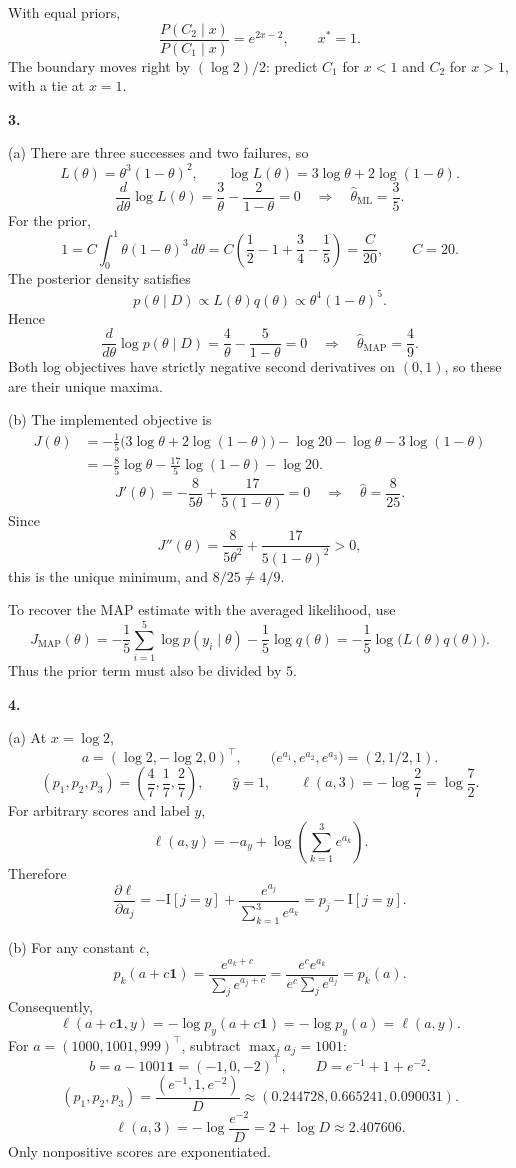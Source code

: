 \documentclass[11pt,a4paper]{article}
\begin{document}
With equal priors,
\[
\frac{P(C_2\mid x)}{P(C_1\mid x)}=e^{2x-2},\qquad x^*=1.
\]
The boundary moves right by $(\log2)/2$: predict $C_1$ for $x<1$ and
$C_2$ for $x>1$, with a tie at $x=1$.

\newpage
\textbf{3.}

(a) There are three successes and two failures, so
\[
L(\theta)=\theta^3(1-\theta)^2,\qquad
\log L(\theta)=3\log\theta+2\log(1-\theta).
\]
\[
\frac{d}{d\theta}\log L(\theta)
=\frac3\theta-\frac2{1-\theta}=0
\quad\Longrightarrow\quad \widehat\theta_{\mathrm{ML}}=\frac35.
\]
For the prior,
\[
1=C\int_0^1\theta(1-\theta)^3\,d\theta
=C\left(\frac12-1+\frac34-\frac15\right)=\frac C{20},
\qquad C=20.
\]
The posterior density satisfies
\[
p(\theta\mid D)\propto L(\theta)q(\theta)
\propto\theta^4(1-\theta)^5.
\]
Hence
\[
\frac{d}{d\theta}\log p(\theta\mid D)
=\frac4\theta-\frac5{1-\theta}=0
\quad\Longrightarrow\quad \widehat\theta_{\mathrm{MAP}}=\frac49.
\]
Both log objectives have strictly negative second derivatives on $(0,1)$,
so these are their unique maxima.

(b) The implemented objective is
\begin{align*}
J(\theta)
&=-\frac15\bigl(3\log\theta+2\log(1-\theta)\bigr)
-\log20-\log\theta-3\log(1-\theta)\\
&=-\frac85\log\theta-\frac{17}{5}\log(1-\theta)-\log20.
\end{align*}
\[
J'(\theta)=-\frac8{5\theta}+\frac{17}{5(1-\theta)}=0
\quad\Longrightarrow\quad \widehat\theta=\frac8{25}.
\]
Since
\[
J''(\theta)=\frac8{5\theta^2}+\frac{17}{5(1-\theta)^2}>0,
\]
this is the unique minimum, and $8/25\ne4/9$.

To recover the MAP estimate with the averaged likelihood, use
\[
J_{\mathrm{MAP}}(\theta)
=-\frac15\sum_{i=1}^5\log p(y_i\mid\theta)-\frac15\log q(\theta)
=-\frac15\log\bigl(L(\theta)q(\theta)\bigr).
\]
Thus the prior term must also be divided by $5$.

\newpage
\textbf{4.}

(a) At $x=\log2$,
\[
a=(\log2,-\log2,0)^\top,\qquad
\bigl(e^{a_1},e^{a_2},e^{a_3}\bigr)=(2,1/2,1).
\]
\[
(p_1,p_2,p_3)=\left(\frac47,\frac17,\frac27\right),\qquad
\widehat y=1,\qquad \ell(a,3)=-\log\frac27=\log\frac72.
\]
For arbitrary scores and label $y$,
\[
\ell(a,y)=-a_y+\log\left(\sum_{k=1}^3e^{a_k}\right).
\]
Therefore
\[
\frac{\partial\ell}{\partial a_j}
=-\mathrm{I}[j=y]+\frac{e^{a_j}}{\sum_{k=1}^3e^{a_k}}
=p_j-\mathrm{I}[j=y].
\]

(b) For any constant $c$,
\[
p_k(a+c\mathbf1)
=\frac{e^{a_k+c}}{\sum_j e^{a_j+c}}
=\frac{e^ce^{a_k}}{e^c\sum_j e^{a_j}}
=p_k(a).
\]
Consequently,
\[
\ell(a+c\mathbf1,y)=-\log p_y(a+c\mathbf1)
=-\log p_y(a)=\ell(a,y).
\]
For $a=(1000,1001,999)^\top$, subtract $\max_j a_j=1001$:
\[
b=a-1001\mathbf1=(-1,0,-2)^\top,\qquad
D=e^{-1}+1+e^{-2}.
\]
\[
(p_1,p_2,p_3)=\frac{(e^{-1},1,e^{-2})}{D}
\approx(0.244728,0.665241,0.090031).
\]
\[
\ell(a,3)=-\log\frac{e^{-2}}D
=2+\log D\approx2.407606.
\]
Only nonpositive scores are exponentiated.
\end{document}
